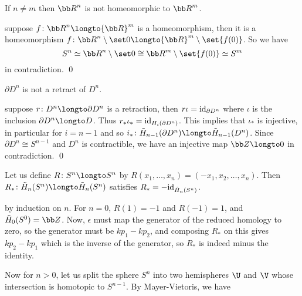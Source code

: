     If $n\neq m$ then ${\bb R}^n$ is not homeomorphic to ${\bb R}^m$.

\ecoro

\Proof suppose $f\colon{\bb R}^n\longto{\bb R}^m$ is a homeomorphism, then it is a homeomorphism $f\colon{\bb R}^n\setminus\set0\longto{\bb R}^m\setminus\set{f(0)}$.
So we have
$$ S^n \simeq {\bb R}^n\setminus\set0 \cong {\bb R}^m\setminus\set{f(0)} \simeq S^m $$
in contradiction.
\qed

\bthrm

    $\partial D^n$ is not a retract of $D^n$.

\ethrm

\Proof suppose $r\colon D^n\longto\partial D^n$ is a retraction, then $r\iota={\rm id}_{\partial D^n}$ where $\iota$ is the inclusion $\partial D^n\longto D$.
Thus $r_*\iota_*={\rm id}_{H_i(\partial D^n)}$.
This implies that $\iota_*$ is injective, in particular for $i=n-1$ and so $i_*\colon\tilde H_{n-1}(\partial D^n)\longto\tilde H_{n-1}(D^n)$.
Since $\partial D^n\cong S^{n-1}$ and $D^n$ is contractible, we have an injective map ${\bb Z}\longto0$ in contradiction.
\qed

\blemm

    Let us define $R\colon S^n\longto S^n$ by $R(x_1,\dots,x_n)=(-x_1,x_2,\dots,x_n)$.
    Then $R_*\colon\tilde H_n(S^n)\longto\tilde H_n(S^n)$ satisfies $R_*=-{\rm id}_{\tilde H_n(S^n)}$.

\elemm

\Proof by induction on $n$.
For $n=0$, $R(1)=-1$ and $R(-1)=1$, and $\tilde H_0(S^0)={\bb Z}$.
Now, $\epsilon$ must map the generator of the reduced homology to zero, so the generator must be $kp_1-kp_2$, and composing $R_*$ on this gives $kp_2-kp_1$ which is the inverse of the generator, so
$R_*$ is indeed minus the identity.

Now for $n>0$, let us split the sphere $S^n$ into two hemispheres $\U$ and $\V$ whose intersection is homotopic to $S^{n-1}$.
By Mayer-Vietoris, we have

\centerline{}

